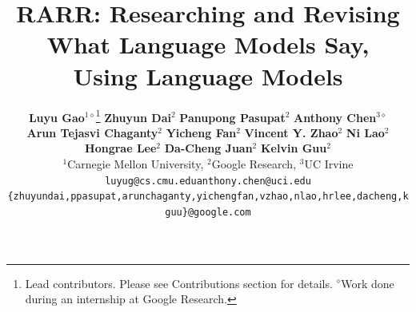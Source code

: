 \documentclass[11pt]{article}
\title{RARR: Researching and Revising What Language Models Say, \\ Using Language Models}
\author{
\textbf{Luyu Gao}$^{1\diamond}$\thanks{\enskip Lead contributors. Please see Contributions section for details. $^\diamond$Work done during an internship at Google Research.} \quad
\textbf{Zhuyun Dai}$^2$\samethanks[1] \quad
\textbf{Panupong Pasupat}$^2$\samethanks[1] \quad
\textbf{Anthony Chen}$^{3\diamond}$\samethanks[1] \quad
\\
\textbf{Arun Tejasvi Chaganty}$^2$\samethanks[1] \quad
\textbf{Yicheng Fan}$^2$\samethanks[1] \quad
\textbf{Vincent Y. Zhao}$^2$ \quad
\textbf{Ni Lao}$^2$ \quad
\\
\textbf{Hongrae Lee}$^2$ \quad
\textbf{Da-Cheng Juan}$^2$ \quad
\textbf{Kelvin Guu}$^2$\samethanks[1]
\\[.5em]
$^1$Carnegie Mellon University, $^2$Google Research, $^3$UC Irvine
\\
\small{\texttt{luyug@cs.cmu.edu\qquad anthony.chen@uci.edu}}
\\
\small{\texttt{\{zhuyundai,ppasupat,arunchaganty,yichengfan,vzhao,nlao,hrlee,dacheng,kguu\}@google.com}}
}
\date{}
\begin{document}
\maketitle



\begin{abstract}

\end{abstract}












\appendix

\end{document}
